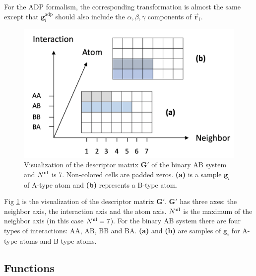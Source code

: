 \documentclass[final,3p,times]{elsarticle}
\begin{document}
For the ADP formalism, the corresponding transformation is almost the same 
except that $\mathbf{g}_{i}^{\mathrm{adp}}$ should also include the 
$\alpha,\beta,\gamma$ components of $\vec{\mathbf{r}}_i$.

% 
%
\begin{figure}
\centering
\includegraphics[scale=0.3]{transformation.png}
\caption{\label{fig:transformation} Visualization of the descriptor matrix 
$\mathbf{G}'$ of the binary AB system and $N^{\mathrm{nl}}$ is 7. Non-colored cells are 
padded zeros. \textbf{(a)} is a sample $\mathbf{g}_i$ of A-type atom and 
\textbf{(b)} represents a B-type atom.}
\end{figure}

Fig \ref{fig:transformation} is the visualization of the descriptor matrix 
$\mathbf{G}'$. $\mathbf{G}'$ has three axes: the neighbor axis, the interaction 
axis and the atom axis. $N^{\mathrm{nl}}$ is the maximum of the neighbor axis (in this case 
$N^{\mathrm{nl}} = 7$). For the binary AB system there are four types of interactions: AA, 
AB, BB and BA. \textbf{(a)} and \textbf{(b)} are samples of $\mathbf{g}_i$ for 
A-type atoms and B-type atoms.

\subsection{Functions}
\label{sec:functions}
\end{document}
